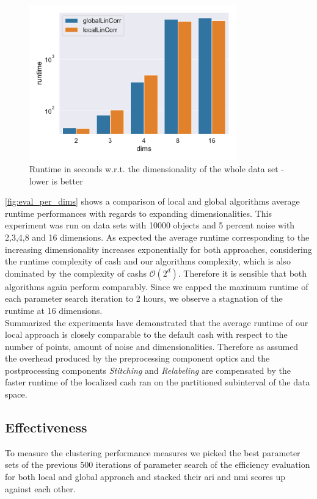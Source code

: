 \begin{figure}[h]
    \centering
        \includegraphics[width=0.8\textwidth]{evaluation/per_dims/Avg_Runtime_O10000_N5_pdims_log.pdf}
    \caption{Runtime in seconds w.r.t. the dimensionality of the whole data set - lower is better}
    \label{fig:eval_per_dims}
\end{figure}

\autoref{fig:eval_per_dims} shows a comparison of local and global algorithms average runtime performances with regards to expanding dimensionalities. This experiment was run on data sets with 10000 objects and 5 percent noise with 2,3,4,8 and 16 dimensions. As expected the average runtime corresponding to the increasing dimensionality increases exponentially for both approaches, considering the runtime complexity of \gls{cash} and our algorithms complexity, which is also dominated by the complexity of \gls{cash}s $\mathcal{O}(2^d)$. Therefore it is sensible that both algorithms again perform comparably.
Since we capped the maximum runtime of each parameter search iteration to 2 hours, we observe a stagnation of the runtime at 16 dimensions.\\

Summarized the experiments have demonstrated that the average runtime of our local approach is closely comparable to the default \gls{cash} with respect to the number of points, amount of noise and dimensionalities. Therefore as assumed the overhead produced by the preprocessing component \gls{optics} and the postprocessing components \textit{Stitching} and \textit{Relabeling} are compensated by the faster runtime of the localized \gls{cash} ran on the partitioned subinterval of the data space. 
 
\subsection{Effectiveness}
To measure the clustering performance measures we picked the best parameter sets of the previous 500 iterations of parameter search of the efficiency evaluation for both local and global approach and stacked their \gls{ari} and \gls{nmi} scores up against each other. 

